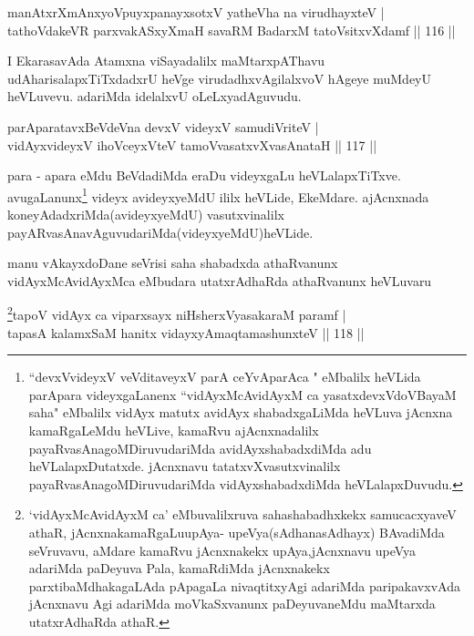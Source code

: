\begin{shl}
manAtxrXmAnxyoV\s puyxpanayxsotxV yatheVha na virudhayxteV |\\
tathoVdakeVR parxvakASxyXmaH savaRM BadarxM tatoV\s sitxvXdamf \hfill || 116 ||
\end{shl}

\begin{artha}
I EkarasavAda Atamxna viSayadalilx maMtarxpAThavu udAharisalapxTiTxdadxrU heVge virudadhxvAgilalxvoV hAgeye muMdeyU heVLuvevu. adariMda idelalxvU oLeLxyadAguvudu.
\end{artha}

\begin{shl}
parAparatavxBeVdeVna devxV videyxV samudiVriteV |\\
vidAyxvideyxV ihoVceyxVteV tamoVvasatxvXvasAnataH \hfill || 117 ||
\end{shl}

\begin{artha}
para - apara eMdu BeVdadiMda eraDu videyxgaLu heVLalapxTiTxve.  avugaLanunx\footnote{``devxVvideyxV veVditaveyxV parA ceYvAparAca " eMbalilx heVLida parApara videyxgaLanenx ``vidAyxMcAvidAyxM ca yasatxdevxVdoVBayaM saha" eMbalilx vidAyx matutx avidAyx shabadxgaLiMda heVLuva jAcnxna kamaRgaLeMdu heVLive, kamaRvu ajAcnxnadalilx payaRvasAnagoMDiruvudariMda avidAyxshabadxdiMda adu heVLalapxDutatxde. jAcnxnavu tatatxvXvasutxvinalilx payaRvasAnagoMDiruvudariMda vidAyxshabadxdiMda heVLalapxDuvudu.} videyx avideyxyeMdU ililx heVLide, EkeMdare. ajAcnxnada koneyAdadxriMda\break (avideyxyeMdU) vasutxvinalilx payARvasAnavAguvudariMda(videyxyeMdU)\break heVLide.
\end{artha}


\begin{artha}
manu vAkayxdoDane seVrisi saha shabadxda athaRvanunx vidAyxMcAvidAyxMca eMbudara utatxrAdhaRda athaRvanunx heVLuvaru
\end{artha}


\begin{shl}
\footnote{`vidAyxMcAvidAyxM ca' eMbuvalilxruva sahashabadhxkekx samucacxyaveV athaR, jAcnxnakamaRgaLu\break upAya- upeVya(sAdhanasAdhayx) BAvadiMda seVruvavu, aMdare kamaRvu jAcnxnakekx upAya,jAcnxnavu upeVya adariMda paDeyuva Pala, kamaRdiMda jAcnxnakekx parxtibaMdhakagaLAda pApagaLa nivaqtitxyAgi adariMda paripakavxvAda jAcnxnavu Agi adariMda moVkaSxvanunx paDeyuvaneMdu maMtarxda utatxrAdhaRda athaR.}tapoV vidAyx ca viparxsayx niHsherxVyasakaraM paramf |\\
tapasA kalamxSaM hanitx vidayxyA\s maqtamashunxteV \hfill || 118 ||
\end{shl}

